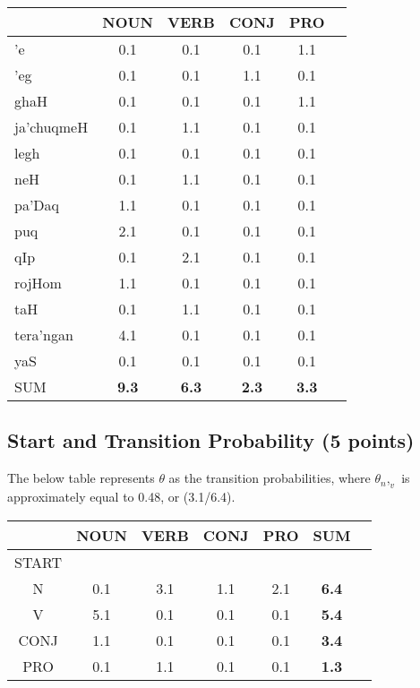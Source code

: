 \documentclass[11pt]{article}
\begin{document}
\begin{center}
\begin{tabular}{|l|c|c|c|c|c|}
\hline
   & NOUN & VERB & CONJ & PRO \\
\hline
'e & 0.1  &  0.1 &  0.1    &  1.1   \\
\hline
'eg &   0.1  & 0.1  &  1.1    &  0.1 \\
\hline
ghaH &  0.1   & 0.1   &  0.1    &  1.1  \\
\hline
ja'chuqmeH &   0.1  & 1.1    &  0.1    &  0.1   \\
\hline
legh &  0.1   &  0.1   &  0.1    &  0.1 \\
\hline
neH &  0.1   &  1.1   &  0.1    &  0.1   \\
\hline
pa'Daq &  1.1   & 0.1    &  0.1    &  0.1 \\
\hline
puq &   2.1  &  0.1   &  0.1    &  0.1 \\
\hline
qIp &   0.1  &   2.1  &  0.1    &  0.1 \\
\hline
rojHom &   1.1  &  0.1   &  0.1    &  0.1\\
\hline
taH &   0.1  &  1.1   &  0.1    &  0.1 \\
\hline
tera'ngan & 4.1    &  0.1   &  0.1    &  0.1 \\
\hline
yaS &  0.1   &  0.1   &  0.1    &  0.1   \\
\hline
SUM & \textbf{9.3} & \textbf{6.3} & \textbf{2.3} & \textbf{3.3} \\
\hline
\end{tabular}
\end{center}

\subsection{Start and Transition Probability (5 points)}

The below table represents \(\theta\) as the transition probabilities, where  \(\theta_n,_v \) is approximately equal to 0.48, or (3.1/6.4).

\begin{center}
\begin{tabular}{|c|c|c|c|c|c|c|}
\hline
      & NOUN & VERB & CONJ & PRO & \textbf{SUM}\\
\hline
START &  &   &  &   & \\
\hline
N     &  0.1 & 3.1  & 1.1  & 2.1 & \textbf{6.4} \\
\hline
V     &  5.1 &  0.1 & 0.1  & 0.1 & \textbf{5.4}\\
\hline
CONJ  & 1.1  & 0.1  &  0.1 & 0.1 & \textbf{3.4}\\
\hline
PRO   & 0.1 & 1.1  &  0.1 & 0.1 & \textbf{1.3}\\
\hline
\end{tabular}
\end{center}
\end{document}

